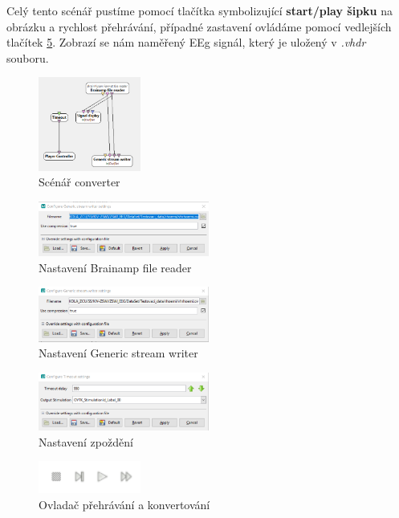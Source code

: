 \documentclass{report}
\begin{document}
 Celý tento scénář pustíme pomocí tlačítka symbolizující \textbf{start/play šipku} na obrázku a rychlost přehrávání, případné zastavení ovládáme pomocí vedlejších tlačítek \ref{fig:btns}. Zobrazí se nám naměřený EEg signál, který je uložený v \textit{.vhdr} souboru.
\begin{figure}[!ht]
\centering
  \includegraphics[width=0.3\textwidth]{pictures/coverter.png}
  \caption{Scénář converter}
  \label{fig:converter}
 \end{figure}
\begin{figure}[!ht]
\centering
  \includegraphics[width=0.5\textwidth]{pictures/setFileReader.png}
  \caption{Nastavení Brainamp file reader}
  \label{fig:filereader}
 \end{figure}
 \begin{figure}[!ht]
\centering
  \includegraphics[width=0.5\textwidth]{pictures/configurewriter.png}
  \caption{Nastavení Generic stream writer}
  \label{fig:filewriter}
 \end{figure}
 \begin{figure}[!ht]
\centering
  \includegraphics[width=0.5\textwidth]{pictures/timeout.png}
  \caption{Nastavení zpoždění}
  \label{fig:timeout}
 \end{figure}
  \begin{figure}[!ht]
\centering
  \includegraphics[width=0.3\textwidth]{pictures/playstart.png}
  \caption{Ovladač přehrávání a konvertování}
  \label{fig:btns}
 \end{figure}
\end{document}
